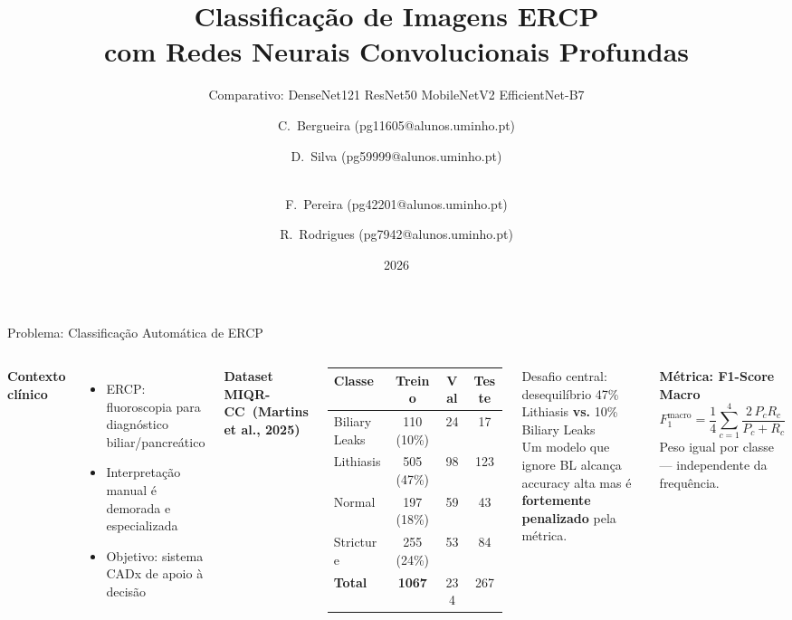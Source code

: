 \documentclass[aspectratio=169]{beamer}
\title[Classificação ERCP com CNNs]{%
  Classificação de Imagens ERCP\\
  com Redes Neurais Convolucionais Profundas}
\subtitle{Comparativo: DenseNet121 \textbullet{} ResNet50 \textbullet{}
          MobileNetV2 \textbullet{} EfficientNet-B7}
\author[Grupo 8: Bergueira, Silva, Pereira, Rodrigues]{%
  C.\ Bergueira (pg11605@alunos.uminho.pt) \and D.\ Silva (pg59999@alunos.uminho.pt) \and\\ F.\ Pereira (pg42201@alunos.uminho.pt) \and R.\ Rodrigues (pg7942@alunos.uminho.pt)}
\institute[UMinho]{%
  Universidade do Minho --- Grupo 8\\[4pt]
  \small Aprendizagem Profunda - Módulo 2 - 2025/2026}
\date{2026}
\begin{document}

\begin{frame}
  \titlepage
\end{frame}

\begin{frame}{Problema: Classificação Automática de ERCP}
  \begin{columns}[T]
      \textbf{Contexto clínico}
      \begin{itemize}
        \item ERCP: fluoroscopia para diagnóstico biliar/pancreático
        \item Interpretação manual é demorada e especializada
        \item Objetivo: sistema CADx de apoio à decisão
      \end{itemize}
      \medskip
      \textbf{Dataset MIQR-CC~(Martins et al., 2025)}
      {\small
      \begin{tabular}{lccc}
        \toprule
        Classe & Treino & Val & Teste \\
        \midrule
        \alert{Biliary Leaks} & 110 (10\%) & 24 & 17 \\
        Lithiasis          & 505 (47\%) & 98 & 123 \\
        Normal             & 197 (18\%) & 59 & 43 \\
        Stricture          & 255 (24\%) & 53 & 84 \\
        \midrule
        \textbf{Total}     & \textbf{1067} & 234 & 267 \\
        \bottomrule
      \end{tabular}
      }
      \begin{alertblock}{Desafio central: desequilíbrio}
        47\% Lithiasis \textbf{vs.} 10\% Biliary Leaks\\[4pt]
        Um modelo que ignore BL alcança accuracy alta
        mas é \textbf{fortemente penalizado} pela métrica.
      \end{alertblock}
      \medskip
      \textbf{Métrica: F1-Score Macro}
      \[
        F_1^{\text{macro}} = \frac{1}{4}\sum_{c=1}^{4}
        \frac{2\,P_c R_c}{P_c + R_c}
      \]
      \small Peso igual por classe --- independente da frequência.
  \end{columns}
\end{frame}
\end{document}

